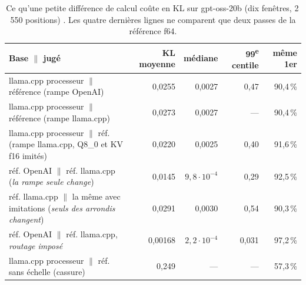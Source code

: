 \begin{table}[ht]
\centering\small
\caption[gpt-oss amplifie les petites erreurs]{Ce qu'une petite différence de calcul coûte en KL sur gpt-oss-20b (dix fenêtres, 2\,550 positions) \mes. Les quatre dernières lignes ne comparent que deux passes de la référence f64.}
\label{tab:t2r-amplification}
\begin{tabular}{@{}p{6.6cm}rrrr@{}}
\toprule
Base $\|$ jugé & KL moyenne & médiane & 99\textsuperscript{e} centile & même 1er \\
\midrule
llama.cpp processeur $\|$ référence (rampe OpenAI) & 0,0255 & 0,0027 & 0,47 & 90,4\,\% \\
llama.cpp processeur $\|$ référence (rampe llama.cpp) & 0,0273 & 0,0027 & --- & 90,4\,\% \\
llama.cpp processeur $\|$ réf. (rampe llama.cpp, Q8\_0 et KV f16 imités) & 0,0220 & 0,0025 & 0,40 & 91,6\,\% \\
\addlinespace
réf. OpenAI $\|$ réf. llama.cpp (\emph{la rampe seule change}) & 0,0145 & $9{,}8\cdot10^{-4}$ & 0,29 & 92,5\,\% \\
réf. llama.cpp $\|$ la même avec imitations (\emph{seuls des arrondis changent}) & 0,0291 & 0,0030 & 0,54 & 90,3\,\% \\
réf. OpenAI $\|$ réf. llama.cpp, \emph{routage imposé} & 0,00168 & $2{,}2\cdot10^{-4}$ & 0,031 & 97,2\,\% \\
llama.cpp processeur $\|$ réf. sans échelle (cassure) & 0,249 & --- & --- & 57,3\,\% \\
\bottomrule
\end{tabular}
\end{table}

